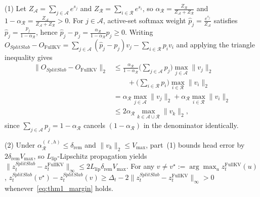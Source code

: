 \documentclass[10pt,journal,compsoc]{IEEEtran}
\theoremstyle{definition}
\theoremstyle{remark}
\newcommand{\SplitSlab}{\textup{\textsc{SplitSlab}}}
\def\SplitSlab{SplitSlab}%
\begin{document}
\begin{IEEEproof}
(1) Let $Z_{\mathcal{A}} = \sum_{j \in \mathcal{A}} e^{s_j}$ and $Z_{\mathcal{R}} = \sum_{i \in \mathcal{R}} e^{s_i}$, so $\alpha_{\mathcal{R}} = \frac{Z_{\mathcal{R}}}{Z_{\mathcal{A}} + Z_{\mathcal{R}}}$ and $1 - \alpha_{\mathcal{R}} = \frac{Z_{\mathcal{A}}}{Z_{\mathcal{A}} + Z_{\mathcal{R}}} > 0$. For $j \in \mathcal{A}$, active-set softmax weight $\hat{p}_j = \frac{e^{s_j}}{Z_{\mathcal{A}}}$ satisfies $\hat{p}_j = \frac{p_j}{1 - \alpha_{\mathcal{R}}}$, hence $\hat{p}_j - p_j = \frac{\alpha_{\mathcal{R}}}{1 - \alpha_{\mathcal{R}}} p_j \ge 0$. Writing $O_{\SplitSlab} - O_{\mathrm{FullKV}} = \sum_{j \in \mathcal{A}} (\hat{p}_j - p_j) v_j - \sum_{i \in \mathcal{R}} p_i v_i$ and applying the triangle inequality gives
\begin{align*}
\|O_{\SplitSlab} - O_{\mathrm{FullKV}}\|_2
&\le \frac{\alpha_{\mathcal{R}}}{1 - \alpha_{\mathcal{R}}} \Big(\sum_{j \in \mathcal{A}} p_j\Big) \max_{j \in \mathcal{A}} \|v_j\|_2 \\
&\qquad + \Big(\sum_{i \in \mathcal{R}} p_i\Big) \max_{i \in \mathcal{R}} \|v_i\|_2 \\
&= \alpha_{\mathcal{R}} \max_{j \in \mathcal{A}} \|v_j\|_2 + \alpha_{\mathcal{R}} \max_{i \in \mathcal{R}} \|v_i\|_2 \\
&\le 2\alpha_{\mathcal{R}} \max_{k \in \mathcal{A}\cup\mathcal{R}} \|v_k\|_2,
\end{align*}
since $\sum_{j \in \mathcal{A}} p_j = 1 - \alpha_{\mathcal{R}}$ cancels $(1 - \alpha_{\mathcal{R}})$ in the denominator identically.

(2) Under $\alpha_{\mathcal{R}}^{(\ell,h)} \le \delta_{\mathrm{rem}}$ and $\|v_k\|_2 \le V_{\max}$, part~(1) bounds head error by $2\delta_{\mathrm{rem}} V_{\max}$, so $L_{\mathrm{lip}}$-Lipschitz propagation yields $\|z_t^{\SplitSlab} - z_t^{\mathrm{FullKV}}\|_\infty \le 2 L_{\mathrm{lip}} \delta_{\mathrm{rem}} V_{\max}$. For any $v \neq v^\star := \arg\max_u z_t^{\mathrm{FullKV}}(u)$, $z_t^{\SplitSlab}(v^\star) - z_t^{\SplitSlab}(v) \ge \Delta_t - 2\|z_t^{\SplitSlab} - z_t^{\mathrm{FullKV}}\|_\infty > 0$ whenever~\eqref{eq:thm1_margin} holds.
\end{IEEEproof}
\end{document}
